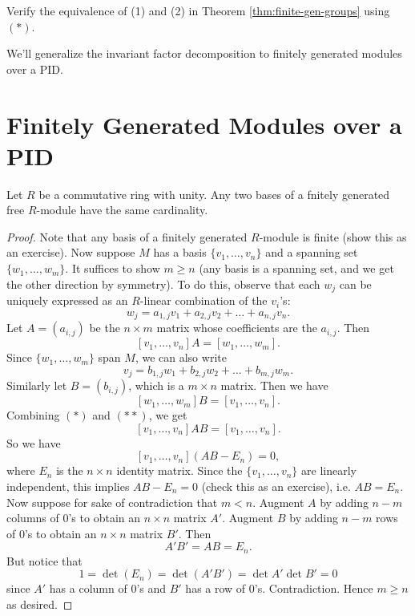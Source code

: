 \begin{exercise}
  Verify the equivalence of (1) and (2) in Theorem
  \ref{thm:finite-gen-groups} using $(*)$.
\end{exercise}

\begin{remark}
  We'll generalize the invariant factor decomposition
  to finitely generated modules over a PID.
\end{remark}

\section{Finitely Generated Modules over a PID}
\begin{lemma}
  Let $R$ be a commutative ring with unity. Any two bases
  of a fnitely generated free $R$-module have the
  same cardinality.
\end{lemma}

\begin{proof}
  Note that any basis of a finitely generated $R$-module
  is finite (show this as an exercise). Now suppose $M$
  has a basis $\{v_1, \dots, v_n\}$ and a spanning set
  $\{w_1, \dots, w_m\}$. It suffices to show $m \ge n$
  (any basis is a spanning set, and we get the other
  direction by symmetry). To do this, observe that
  each $w_j$ can be uniquely expressed as an $R$-linear
  combination of the $v_i$'s:
  \[
    w_j = a_{1, j} v_1 + a_{2, j} v_2 + \dots + a_{n, j} v_n.
  \]
  Let $A = (a_{i, j})$ be the $n \times m$ matrix whose
  coefficients are the $a_{i, j}$. Then
  \[
    [v_1, \dots, v_n] A = [w_1, \dots, w_m]. \tag{$*$}
  \]
  Since $\{w_1, \dots, w_m\}$ span $M$, we can also write
  \[
    v_j = b_{1, j} w_1 + b_{2, j} w_2 + \dots + b_{m, j} w_m.
  \]
  Similarly let $B = (b_{i, j})$, which is a
  $m \times n$ matrix. Then we have
  \[
    [w_1, \dots, w_m] B = [v_1, \dots, v_n]. \tag{$**$}
  \]
  Combining $(*)$ and $(**)$, we get
  \[
    [v_1, \dots, v_n] A B = [v_1, \dots, v_n].
  \]
  So we have
  \[
    [v_1, \dots, v_n](AB - E_n) = 0,
  \]
  where $E_n$ is the $n \times n$ identity matrix. Since
  the $\{v_1, \dots, v_n\}$ are linearly independent,
  this implies $AB - E_n = 0$ (check this as an exercise),
  i.e. $AB = E_n$. Now suppose for sake of contradiction
  that $m < n$. Augment $A$ by adding $n - m$ columns
  of $0$'s to obtain an $n \times n$ matrix $A'$. Augment
  $B$ by adding $n - m$ rows of $0$'s to obtain
  an $n \times n$ matrix $B'$. Then
  \[
    A'B' = AB = E_n.
  \]
  But notice that
  \[
    1 = \det(E_n) = \det(A'B') = \det A' \det B' = 0
  \]
  since $A'$ has a column of $0$'s and $B'$ has a row
  of $0$'s. Contradiction. Hence $m \ge n$ as desired.
\end{proof}

